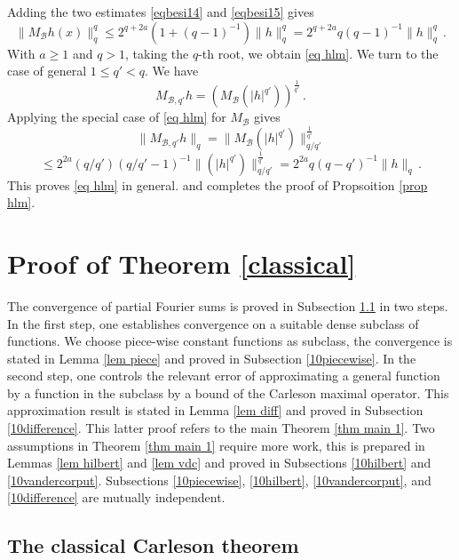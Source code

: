 Adding the two estimates
\eqref{eqbesi14} and \eqref{eqbesi15} gives
\begin{equation}
    \|M_{\mathcal{B}}h(x)\|_q^q
    \le 2^{q+2a} (1+(q-1)^{-1})\|h\|_q^q
    = 2^{q+2a} q(q-1)^{-1}\|h\|_q^q
    \, .
    \end{equation}
With $a\ge 1$ and $q>1$, taking the $q$-th root, we obtain \eqref{eq hlm}.
We turn to the case of general
$1\le q'<q$.
We have
\begin{equation}
    M_{\mathcal{B},q'}h=(M_{\mathcal{B}} (|h|^{q'}))^{\frac 1{q'}}\, .
\end{equation}
Applying the special case of \eqref{eq hlm} for $M_{\mathcal{B}}$ gives
\begin{equation}
    \|M_{\mathcal{B},q'}h\|_q=
    \|M_{\mathcal{B}} (|h|^{q'})\|_{q/q'}^{\frac 1{q'}}
\end{equation}
\begin{equation}
    \le 2^{2a} (q/q') (q/q'-1)^{-1}
    \|(|h|^{q'})\|_{q/q'}^{\frac 1{q'}}
    =2^{2a} q(q-q')^{-1}\|h\|_q\, .
\end{equation}
This proves \eqref{eq hlm} in general.
and completes the proof of Propsoition \ref{prop hlm}.

\chapter{Proof of Theorem \ref{classical}}

The convergence of partial Fourier sums is proved in
Subsection \ref{10classical} in two steps. In the first step,
one establishes convergence on a suitable dense subclass of functions. We choose piece-wise constant functions as subclass, the convergence is stated in Lemma \ref{lem piece} and proved in Subsection \ref{10piecewise}.
In the second step, one controls the relevant error of approximating a general function by a function in
the subclass by a bound of the Carleson maximal operator. This approximation result is stated
in Lemma \ref{lem diff} and proved in Subsection \ref{10difference}.
This latter proof refers to the main Theorem \ref{thm main 1}. Two assumptions in Theorem \ref{thm main 1} require more work, this is prepared in Lemmas \ref{lem hilbert} and \ref{lem vdc} and proved in Subsections \ref{10hilbert}
and \ref{10vandercorput}. Subsections \ref{10piecewise},
\ref{10hilbert}, \ref{10vandercorput}, and \ref{10difference}
are mutually independent.


\section{The classical Carleson theorem}
\label{10classical}

